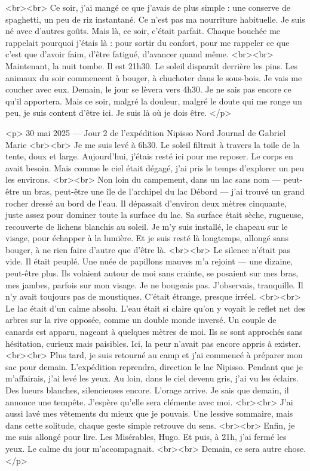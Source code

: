 <br><br>
Ce soir, j’ai mangé ce que j’avais de plus simple : une conserve de spaghetti, un peu de riz instantané. Ce n’est pas ma nourriture habituelle. Je suis né avec d’autres goûts. Mais là, ce soir, c’était parfait. Chaque bouchée me rappelait pourquoi j’étais là : pour sortir du confort, pour me rappeler ce que c’est que d’avoir faim, d’être fatigué, d’avancer quand même.
<br><br>
Maintenant, la nuit tombe. Il est 21h30. Le soleil disparaît derrière les pins. Les animaux du soir commencent à bouger, à chuchoter dans le sous-bois. Je vais me coucher avec eux. Demain, le jour se lèvera vers 4h30. Je ne sais pas encore ce qu’il apportera. Mais ce soir, malgré la douleur, malgré le doute qui me ronge un peu, je suis content d’être ici. Je suis là où je dois être.
</p>

<p>
30 mai 2025 — Jour 2 de l’expédition Nipisso Nord
Journal de Gabriel Marie
<br><br>
Je me suis levé à 6h30. Le soleil filtrait à travers la toile de la tente, doux et large. Aujourd’hui, j’étais resté ici pour me reposer. Le corps en avait besoin. Mais comme le ciel était dégagé, j’ai pris le temps d’explorer un peu les environs.
<br><br>
Non loin du campement, dans un lac sans nom — peut-être un bras, peut-être une île de l’archipel du lac Débord — j’ai trouvé un grand rocher dressé au bord de l’eau. Il dépassait d’environ deux mètres cinquante, juste assez pour dominer toute la surface du lac. Sa surface était sèche, rugueuse, recouverte de lichens blanchis au soleil. Je m’y suis installé, le chapeau sur le visage, pour échapper à la lumière. Et je suis resté là longtemps, allongé sans bouger, à ne rien faire d’autre que d’être là.
<br><br>
Le silence n’était pas vide. Il était peuplé. Une nuée de papillons mauves m’a rejoint — une dizaine, peut-être plus. Ils volaient autour de moi sans crainte, se posaient sur mes bras, mes jambes, parfois sur mon visage. Je ne bougeais pas. J’observais, tranquille. Il n’y avait toujours pas de moustiques. C’était étrange, presque irréel.
<br><br>
Le lac était d’un calme absolu. L’eau était si claire qu’on y voyait le reflet net des arbres sur la rive opposée, comme un double monde inversé. Un couple de canards est apparu, nageant à quelques mètres de moi. Ils se sont approchés sans hésitation, curieux mais paisibles. Ici, la peur n’avait pas encore appris à exister.
<br><br>
Plus tard, je suis retourné au camp et j’ai commencé à préparer mon sac pour demain. L’expédition reprendra, direction le lac Nipisso. Pendant que je m’affairais, j’ai levé les yeux. Au loin, dans le ciel devenu gris, j’ai vu les éclairs. Des lueurs blanches, silencieuses encore. L’orage arrive. Je sais que demain, il annonce une tempête. J’espère qu’elle sera clémente avec moi.
<br><br>
J’ai aussi lavé mes vêtements du mieux que je pouvais. Une lessive sommaire, mais dans cette solitude, chaque geste simple retrouve du sens.
<br><br>
Enfin, je me suis allongé pour lire. Les Misérables, Hugo. Et puis, à 21h, j’ai fermé les yeux. Le calme du jour m’accompagnait.
<br><br>
Demain, ce sera autre chose.
</p>

